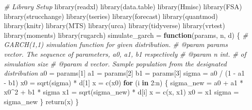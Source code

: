 \documentclass[
  11pt,
]{article}
\newenvironment{Shaded}{\begin{snugshade}}{\end{snugshade}}
\newcommand{\CommentTok}[1]{\textcolor[rgb]{0.56,0.35,0.01}{\textit{#1}}}
\newcommand{\ControlFlowTok}[1]{\textcolor[rgb]{0.13,0.29,0.53}{\textbf{#1}}}
\newcommand{\DecValTok}[1]{\textcolor[rgb]{0.00,0.00,0.81}{#1}}
\newcommand{\FunctionTok}[1]{\textcolor[rgb]{0.00,0.00,0.00}{#1}}
\newcommand{\NormalTok}[1]{#1}
\newcommand{\OtherTok}[1]{\textcolor[rgb]{0.56,0.35,0.01}{#1}}
\newcommand{\SpecialCharTok}[1]{\textcolor[rgb]{0.00,0.00,0.00}{#1}}
\begin{document}
\begin{Shaded}
\begin{Highlighting}[]
\CommentTok{\# Library Setup}
\FunctionTok{library}\NormalTok{(readxl)}
\FunctionTok{library}\NormalTok{(data.table)}
\FunctionTok{library}\NormalTok{(Hmisc)}
\FunctionTok{library}\NormalTok{(FSA)}
\FunctionTok{library}\NormalTok{(strucchange)}
\FunctionTok{library}\NormalTok{(tseries)}
\FunctionTok{library}\NormalTok{(forecast)}
\FunctionTok{library}\NormalTok{(quantmod)}
\FunctionTok{library}\NormalTok{(knitr)}
\FunctionTok{library}\NormalTok{(MTS)}
\FunctionTok{library}\NormalTok{(urca)}
\FunctionTok{library}\NormalTok{(tidyverse)}
\FunctionTok{library}\NormalTok{(vrtest)}
\FunctionTok{library}\NormalTok{(moments)}
\FunctionTok{library}\NormalTok{(rugarch)}
\NormalTok{simulate\_garch }\OtherTok{=} \ControlFlowTok{function}\NormalTok{(params, n, d)  \{}
  \CommentTok{\#\textquotesingle{} GARCH(1,1) simulation function for given distribution.}
  \CommentTok{\#\textquotesingle{} @param params vector. The sequence of parameters, a0, a1, b1 respectively}
  \CommentTok{\#\textquotesingle{} @param n int. \# of simulation size}
  \CommentTok{\#\textquotesingle{} @param d vector. Sample population from the designated distribution}
\NormalTok{  a0 }\OtherTok{=}\NormalTok{ params[}\DecValTok{1}\NormalTok{]}
\NormalTok{  a1 }\OtherTok{=}\NormalTok{ params[}\DecValTok{2}\NormalTok{]}
\NormalTok{  b1 }\OtherTok{=}\NormalTok{ params[}\DecValTok{3}\NormalTok{]}
\NormalTok{  sigma }\OtherTok{=}\NormalTok{ a0 }\SpecialCharTok{/}\NormalTok{ (}\DecValTok{1} \SpecialCharTok{{-}}\NormalTok{ a1 }\SpecialCharTok{{-}}\NormalTok{ b1)}
\NormalTok{  x0 }\OtherTok{=} \FunctionTok{sqrt}\NormalTok{(sigma) }\SpecialCharTok{*}\NormalTok{ d[}\DecValTok{1}\NormalTok{]}
\NormalTok{  x }\OtherTok{=} \FunctionTok{c}\NormalTok{(x0)}
  \ControlFlowTok{for}\NormalTok{ (i }\ControlFlowTok{in} \DecValTok{2}\SpecialCharTok{:}\NormalTok{n) \{}
\NormalTok{    sigma\_new }\OtherTok{=}\NormalTok{ a0 }\SpecialCharTok{+}\NormalTok{ a1 }\SpecialCharTok{*}\NormalTok{ x0}\SpecialCharTok{\^{}}\DecValTok{2} \SpecialCharTok{+}\NormalTok{ b1 }\SpecialCharTok{*}\NormalTok{ sigma}
\NormalTok{    x1 }\OtherTok{=} \FunctionTok{sqrt}\NormalTok{(sigma\_new) }\SpecialCharTok{*}\NormalTok{ d[i]}
\NormalTok{    x }\OtherTok{=} \FunctionTok{c}\NormalTok{(x, x1)}
\NormalTok{    x0 }\OtherTok{=}\NormalTok{ x1}
\NormalTok{    sigma }\OtherTok{=}\NormalTok{ sigma\_new}
\NormalTok{  \}}
  \FunctionTok{return}\NormalTok{(x)}
\NormalTok{\}}


\end{Highlighting}
\end{Shaded}
\end{document}
